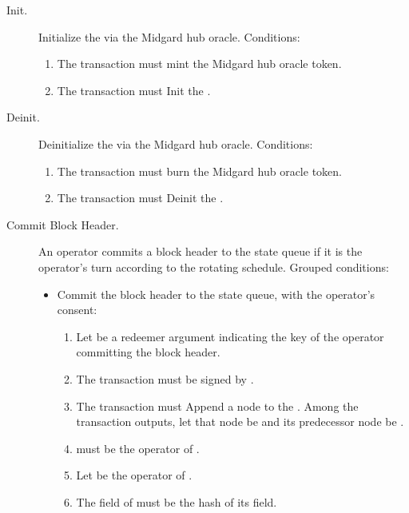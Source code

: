 \documentclass[../midgard.tex]{subfiles}
\begin{document}
\begin{description}
    \item[Init.] Initialize the  via the Midgard hub oracle. Conditions:
        \begin{enumerate}
            \item The transaction must mint the Midgard hub oracle token.
            \item The transaction must Init the .
        \end{enumerate}

    \item[Deinit.] Deinitialize the  via the Midgard hub oracle. Conditions:
        \begin{enumerate}
            \item The transaction must burn the Midgard hub oracle token.
            \item The transaction must Deinit the .
        \end{enumerate}

    \item[Commit Block Header.] An operator commits a block header to the state queue if it is the operator's turn according to the rotating schedule. Grouped conditions:
        \begin{itemize}
            \item Commit the block header to the state queue, with the operator's consent:
            \begin{enumerate}
                \item Let  be a redeemer argument indicating the key of the operator committing the block header.
                \item The transaction must be signed by . 
                \item The transaction must Append a node to the . Among the transaction outputs, let that node be  and its predecessor node be .
                \item {} must be the operator of .
                \item Let  be the operator of .
                \item The  field of  must be the hash of its  field. 
            \end{enumerate}


\end{itemize}
\end{description}
\end{document}
